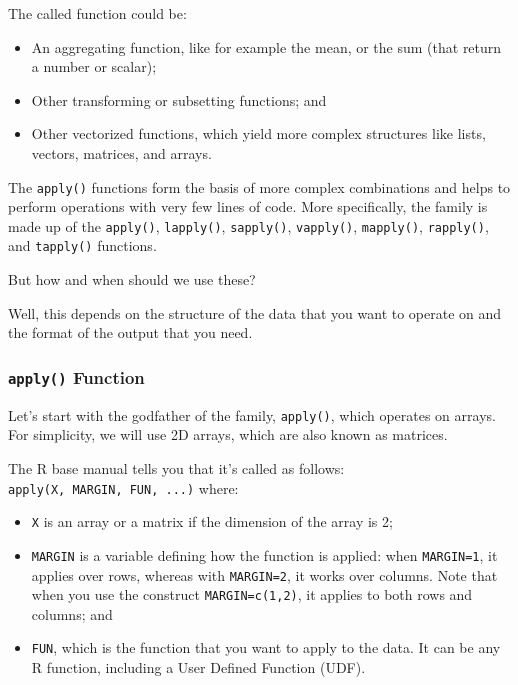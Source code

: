 \documentclass[
]{book}
\providecommand{\tightlist}{%
  \setlength{\itemsep}{0pt}\setlength{\parskip}{0pt}}
\begin{document}
The called function could be:

\begin{itemize}
\tightlist
\item
  An aggregating function, like for example the mean, or the sum (that return a number or scalar);
\item
  Other transforming or subsetting functions; and
\item
  Other vectorized functions, which yield more complex structures like lists, vectors, matrices, and arrays.
\end{itemize}

The \texttt{apply()} functions form the basis of more complex combinations and helps to perform operations with very few lines of code. More specifically, the family is made up of the \texttt{apply()}, \texttt{lapply()}, \texttt{sapply()}, \texttt{vapply()}, \texttt{mapply()}, \texttt{rapply()}, and \texttt{tapply()} functions.

But how and when should we use these?

Well, this depends on the structure of the data that you want to operate on and the format of the output that you need.

\hypertarget{apply-function}{%
\subsubsection{\texorpdfstring{\texttt{apply()} Function}{apply() Function}}\label{apply-function}}

Let's start with the godfather of the family, \texttt{apply()}, which operates on arrays. For simplicity, we will use 2D arrays, which are also known as matrices.

The R base manual tells you that it's called as follows: \texttt{apply(X,\ MARGIN,\ FUN,\ ...)} where:

\begin{itemize}
\tightlist
\item
  \texttt{X} is an array or a matrix if the dimension of the array is 2;
\item
  \texttt{MARGIN} is a variable defining how the function is applied: when \texttt{MARGIN=1}, it applies over rows, whereas with \texttt{MARGIN=2}, it works over columns. Note that when you use the construct \texttt{MARGIN=c(1,2)}, it applies to both rows and columns; and
\item
  \texttt{FUN}, which is the function that you want to apply to the data. It can be any R function, including a User Defined Function (UDF).
\end{itemize}
\end{document}
